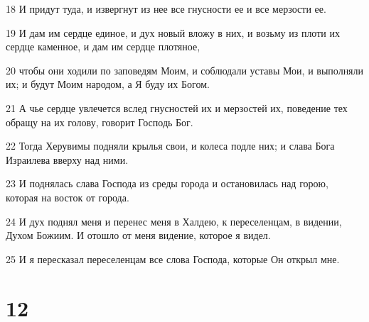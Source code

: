 \par 18 И придут туда, и извергнут из нее все гнусности ее и все мерзости ее.
\par 19 И дам им сердце единое, и дух новый вложу в них, и возьму из плоти их сердце каменное, и дам им сердце плотяное,
\par 20 чтобы они ходили по заповедям Моим, и соблюдали уставы Мои, и выполняли их; и будут Моим народом, а Я буду их Богом.
\par 21 А чье сердце увлечется вслед гнусностей их и мерзостей их, поведение тех обращу на их голову, говорит Господь Бог.
\par 22 Тогда Херувимы подняли крылья свои, и колеса подле них; и слава Бога Израилева вверху над ними.
\par 23 И поднялась слава Господа из среды города и остановилась над горою, которая на восток от города.
\par 24 И дух поднял меня и перенес меня в Халдею, к переселенцам, в видении, Духом Божиим. И отошло от меня видение, которое я видел.
\par 25 И я пересказал переселенцам все слова Господа, которые Он открыл мне.

\chapter{12}

